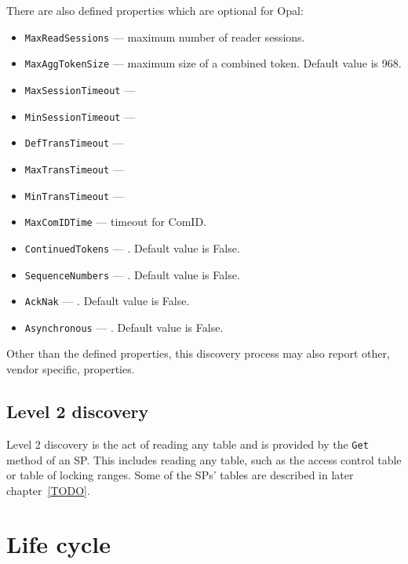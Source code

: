 There are also defined properties which are optional for Opal:
\begin{itemize}
\item \verb|MaxReadSessions| --- maximum number of reader sessions.
\item \verb|MaxAggTokenSize| --- maximum size of a combined token. Default value is 968.
\item \verb|MaxSessionTimeout| --- 
\item \verb|MinSessionTimeout| --- 
\item \verb|DefTransTimeout| --- 
\item \verb|MaxTransTimeout| --- 
\item \verb|MinTransTimeout| --- 
\item \verb|MaxComIDTime| --- timeout for ComID.
\item \verb|ContinuedTokens| --- . Default value is False.
\item \verb|SequenceNumbers| --- . Default value is False.
\item \verb|AckNak| --- . Default value is False.
\item \verb|Asynchronous| --- . Default value is False.
\end{itemize}

Other than the defined properties, this discovery process may also report other, vendor specific, properties.

\subsection{Level 2 discovery}

Level 2 discovery is the act of reading any table and is provided by the \verb|Get| method of an SP. This includes reading any table, such as the access control table or table of locking ranges. Some of the SPs' tables are described in later chapter~\ref{TODO}.


\section{Life cycle}

